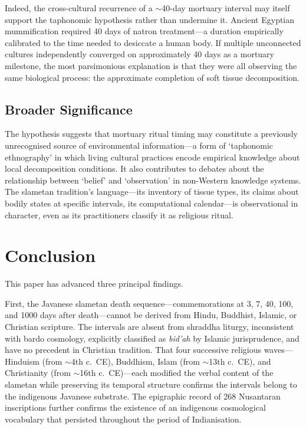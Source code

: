 \documentclass[12pt,a4paper]{article}
\begin{document}
Indeed, the cross-cultural recurrence of a $\sim$40-day mortuary interval may itself support the taphonomic hypothesis rather than undermine it. Ancient Egyptian mummification required 40 days of natron treatment---a duration empirically calibrated to the time needed to desiccate a human body. If multiple unconnected cultures independently converged on approximately 40 days as a mortuary milestone, the most parsimonious explanation is that they were all observing the same biological process: the approximate completion of soft tissue decomposition.

\subsection{Broader Significance}

The hypothesis suggests that mortuary ritual timing may constitute a previously unrecognised source of environmental information---a form of `taphonomic ethnography' in which living cultural practices encode empirical knowledge about local decomposition conditions. It also contributes to debates about the relationship between `belief' and `observation' in non-Western knowledge systems. The slametan tradition's language---its inventory of tissue types, its claims about bodily states at specific intervals, its computational calendar---is observational in character, even as its practitioners classify it as religious ritual.


\section{Conclusion}

This paper has advanced three principal findings.

First, the Javanese slametan death sequence---commemorations at 3, 7, 40, 100, and 1000 days after death---cannot be derived from Hindu, Buddhist, Islamic, or Christian scripture. The intervals are absent from shraddha liturgy, inconsistent with bardo cosmology, explicitly classified as \textit{bid'ah} by Islamic jurisprudence, and have no precedent in Christian tradition. That four successive religious waves---Hinduism (from $\sim$4th c.\ CE), Buddhism, Islam (from $\sim$13th c.\ CE), and Christianity (from $\sim$16th c.\ CE)---each modified the verbal content of the slametan while preserving its temporal structure confirms the intervals belong to the indigenous Javanese substrate. The epigraphic record of 268 Nusantaran inscriptions further confirms the existence of an indigenous cosmological vocabulary that persisted throughout the period of Indianisation.
\end{document}
